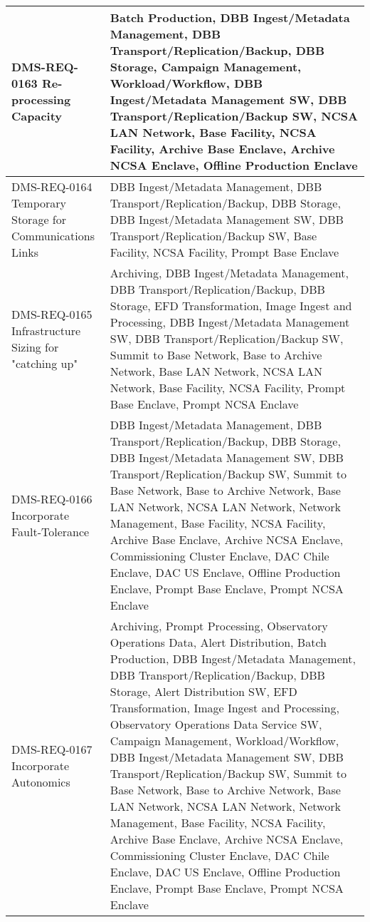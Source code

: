 \begin{longtable}{p{}p{}}
DMS-REQ-0163 Re-processing Capacity & Batch Production, DBB Ingest/Metadata Management, DBB Transport/Replication/Backup, DBB Storage, Campaign Management, Workload/Workflow, DBB Ingest/Metadata Management SW, DBB Transport/Replication/Backup SW, NCSA LAN Network, Base Facility, NCSA Facility, Archive Base Enclave, Archive NCSA Enclave, Offline Production Enclave \\ \hline
DMS-REQ-0164 Temporary Storage for Communications Links & DBB Ingest/Metadata Management, DBB Transport/Replication/Backup, DBB Storage, DBB Ingest/Metadata Management SW, DBB Transport/Replication/Backup SW, Base Facility, NCSA Facility, Prompt Base Enclave \\ \hline
DMS-REQ-0165 Infrastructure Sizing for "catching up" & Archiving, DBB Ingest/Metadata Management, DBB Transport/Replication/Backup, DBB Storage, EFD Transformation, Image Ingest and Processing, DBB Ingest/Metadata Management SW, DBB Transport/Replication/Backup SW, Summit to Base Network, Base to Archive Network, Base LAN Network, NCSA LAN Network, Base Facility, NCSA Facility, Prompt Base Enclave, Prompt NCSA Enclave \\ \hline
DMS-REQ-0166 Incorporate Fault-Tolerance & DBB Ingest/Metadata Management, DBB Transport/Replication/Backup, DBB Storage, DBB Ingest/Metadata Management SW, DBB Transport/Replication/Backup SW, Summit to Base Network, Base to Archive Network, Base LAN Network, NCSA LAN Network, Network Management, Base Facility, NCSA Facility, Archive Base Enclave, Archive NCSA Enclave, Commissioning Cluster Enclave, DAC Chile Enclave, DAC US Enclave, Offline Production Enclave, Prompt Base Enclave, Prompt NCSA Enclave \\ \hline
DMS-REQ-0167 Incorporate Autonomics & Archiving, Prompt Processing, Observatory Operations Data, Alert Distribution, Batch Production, DBB Ingest/Metadata Management, DBB Transport/Replication/Backup, DBB Storage, Alert Distribution SW, EFD Transformation, Image Ingest and Processing, Observatory Operations Data Service SW, Campaign Management, Workload/Workflow, DBB Ingest/Metadata Management SW, DBB Transport/Replication/Backup SW, Summit to Base Network, Base to Archive Network, Base LAN Network, NCSA LAN Network, Network Management, Base Facility, NCSA Facility, Archive Base Enclave, Archive NCSA Enclave, Commissioning Cluster Enclave, DAC Chile Enclave, DAC US Enclave, Offline Production Enclave, Prompt Base Enclave, Prompt NCSA Enclave \\ \hline

\end{longtable}
